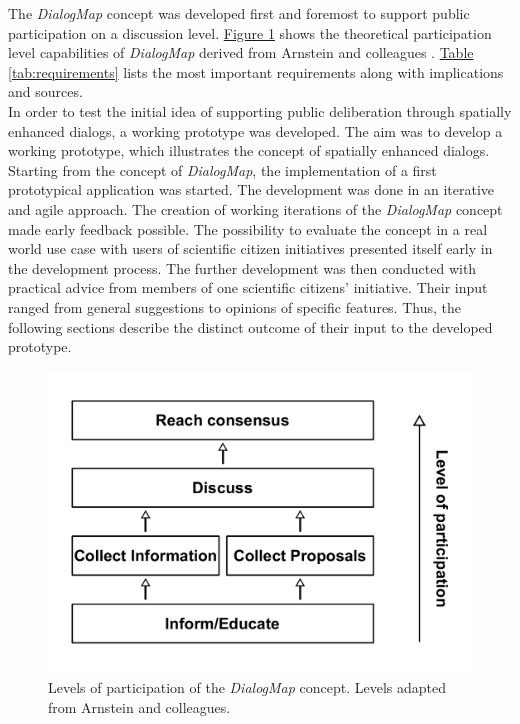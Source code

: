 The \textit{DialogMap} concept was developed first and foremost to support public participation on a discussion level. \hyperref[fig:my_ladder]{Figure \ref{fig:my_ladder}} shows the theoretical participation level capabilities of \textit{DialogMap} derived from Arnstein and colleagues \cite{Arnstein1969_citizen_participation,Wiedemann1993355,Connor1988_new_ladder}. \hyperref[tab:requirements]{Table \ref{tab:requirements}} lists the most important requirements along with implications and sources.\\
In order to test the initial idea of supporting public deliberation through spatially enhanced dialogs, a working prototype was developed. The aim was to develop a working prototype, which illustrates the concept of spatially enhanced dialogs. Starting from the concept of \textit{DialogMap}, the implementation of a first prototypical application was started. The development was done in an iterative and agile approach. The creation of working iterations of the \textit{DialogMap} concept made early feedback possible. The possibility to evaluate the concept in a real world use case with users of scientific citizen initiatives  presented itself early in the development process. The further development was then conducted with practical advice from members of one scientific citizens' initiative. Their input ranged from general suggestions to opinions of specific features. Thus, the following sections describe the distinct outcome of their input to the developed prototype.

\begin{figure}[!h]
    \centering
    \includegraphics[width=1\columnwidth]{images/my_ladder}
    \caption{Levels of participation of the \textit{DialogMap} concept. Levels adapted from Arnstein and colleagues.}
    \label{fig:my_ladder}
\end{figure}


